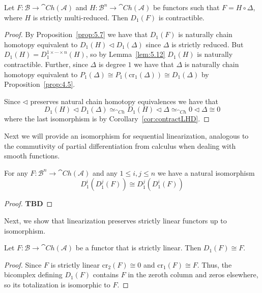 \begin{cor}[label=cor:5.13]
    Let $F:\mathcal{B}\to \cat{Ch}(\mathcal{A})$ and $H:\mathcal{B}^n\to \cat{Ch}(\mathcal{A})$ be functors such that $F = H\circ \Delta$, where $H$ is strictly multi-reduced. Then $D_1(F)$ is contractible.
\end{cor}
\begin{proof}
    By Proposition~\ref{prop:5.7} we have that $D_1(F)$ is naturally chain homotopy equivalent to $D_1(H)\lhd D_1(\Delta)$ since $\Delta$ is strictly reduced. But $D_1(H) = D_1^{1\times \cdots \times n}(H)$, so by Lemma~\ref{lem:5.12} $D_1(H)$ is naturally contractible. Further, since $\Delta$ is degree $1$ we have that $\Delta$ is naturally chain homotopy equivalent to $P_1(\Delta) \cong P_1(\text{cr}_1(\Delta)) \cong D_1(\Delta)$ by Proposition~\ref{prop:4.5}. 

    \vspace{10pt}

    Since $\lhd$ preserves natural chain homotopy equivalences we have that 
    \begin{equation*}
        D_1(H)\lhd D_1(\Delta) \simeq_{\cat{Ch}}D_1(H)\lhd \Delta \simeq_{\cat{Ch}} 0 \lhd \Delta \cong 0
    \end{equation*}
    where the last isomorphism is by Corollary~\ref{cor:contractLHD}.
\end{proof}

Next we will provide an isomorphism for sequential linearization, analogous to the commutivity of partial differentiation from calculus when dealing with smooth functions.

\begin{lem}[label=lem:5.15]
    For any $F:\mathcal{B}^n\to \cat{Ch}(\mathcal{A})$ and any $1 \leq i,j\leq n$ we have a natural isomorphism
    \begin{equation*}
        D_1^i(D_1^j(F)) \cong D_1^j(D_1^i(F))
    \end{equation*}
\end{lem}
\begin{proof}
    \textbf{TBD} 
\end{proof}

Next, we show that linearization preserves strictly linear functors up to isomorphism.

\begin{prop}[label=prop:strictLin]
    Let $F:\mathcal{B}\to \cat{Ch}(\mathcal{A})$ be a functor that is strictly linear. Then $D_1(F)\cong F$.
\end{prop}
\begin{proof}
    Since $F$ is strictly linear $\text{cr}_2(F) \cong 0$ and $\text{cr}_1(F) \cong F$. Thus, the bicomplex defining $D_1(F)$ contains $F$ in the zeroth column and zeros elsewhere, so its totalization is isomorphic to $F$.
\end{proof}

